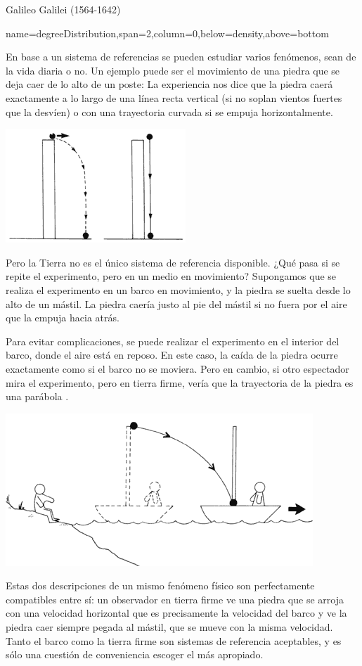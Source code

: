 \documentclass[a0paper,portrait]{baposter}
\begin{document}
\begin{poster}
{\begin{center}
	Galileo Galilei (1564-1642)
\end{center}


}

{name=degreeDistribution,span=2,column=0,below=density,above=bottom}
{
En base a un sistema de referencias se pueden estudiar varios fenómenos, sean de la vida diaria o no. Un ejemplo puede ser el movimiento de una piedra que se deja caer de lo alto de un poste: La experiencia nos dice que la piedra caerá exactamente a lo largo de una línea recta vertical (si no soplan vientos fuertes que la desvíen) o con una trayectoria curvada si se empuja horizontalmente.
\vspace{-0.2em}
\begin{center}
	\includegraphics[width=0.41\linewidth]{j.png}

\end{center}

Pero la Tierra no es el único sistema de referencia disponible. ¿Qué pasa si se repite el experimento, pero en un medio en movimiento?
Supongamos que se realiza el experimento en un barco en movimiento, y la piedra se suelta desde lo alto de un mástil. La piedra caería justo al pie del mástil si no fuera por el aire que la empuja hacia atrás. 

Para evitar complicaciones, se puede realizar el experimento en el interior del barco, donde el aire está en reposo. En este caso, la caída de la piedra ocurre exactamente como si el barco no se moviera. 
Pero en cambio, si otro espectador mira el experimento, pero en tierra firme, vería que la trayectoria de la piedra es una parábola .

\begin{center}
	\includegraphics[width=0.7\linewidth]{bah.png}
\end{center}

 Estas dos descripciones de un mismo fenómeno físico son perfectamente compatibles entre sí: un observador en tierra firme ve una piedra que se arroja con una velocidad horizontal que es precisamente la velocidad del barco y ve la piedra caer siempre pegada al mástil, que se mueve con la misma velocidad. Tanto el barco como la tierra firme son sistemas de referencia aceptables, y es sólo
una cuestión de conveniencia escoger el más apropiado.
}


\end{poster}
\end{document}
